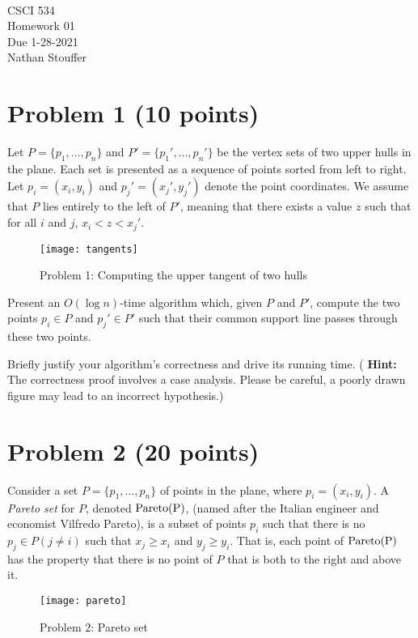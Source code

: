 \documentclass[11pt]{article}
\newcommand{\course}{CSCI 534}
\newcommand{\proj}{Homework 01}
\newcommand{\dueDate}{1-28-2021}
\newcommand{\name}{Nathan Stouffer}
\newcommand{\pareto}[1]{\rm{Pareto}(#1)}
\begin{document}
{ ~\\
    \course \\
    \proj \\
    Due \dueDate \\
    \name
}

\section*{Problem 1 (10 points)}

Let $P = \{ p_1, \ldots, p_n \}$ and $P' = \{ p_1', \ldots, p_n' \}$ be the
vertex sets of two upper hulls in the plane.  Each set is presented as a
sequence of points sorted from left to right.  Let $p_i = (x_i, y_i)$ and $p_j'
= (x_j', y_j')$ denote the point coordinates.  We assume that $P$ lies entirely
to the left of $P'$, meaning that there exists a value $z$ such that for all
$i$ and $j$, $x_i < z < x_j'$.

\begin{figure}[h]
    \centering
    \texttt{[image: tangents]}
    \caption{Problem 1: Computing the upper tangent of two hulls}
\end{figure}

Present an $O(\log n)$-time algorithm which, given $P$ and $P'$, compute the two
points $p_i \in P$ and $p_j' \in P'$ such that their common support line passes
through these two points.

Briefly justify your algorithm's correctness and drive its running time.  ({\bf
Hint:} The correctness proof involves a case analysis.  Please be careful, a
poorly drawn figure may lead to an incorrect hypothesis.)

\section*{Problem 2 (20 points)}

Consider a set $P = \{p_1, \ldots, p_n \}$ of points in the plane, where $p_i =
(x_i, y_i)$. A \emph{Pareto set} for $P$, denoted $\pareto{P}$, (named after
the Italian engineer and economist Vilfredo Pareto), is a subset of points
$p_i$ such that there is no $p_j \in P (j \neq i)$ such that $x_j \geq x_i$ and
$y_j \geq y_i$.  That is, each point of $\pareto{P}$ has the property that
there is no point of $P$ that is both to the right and above it.

\begin{figure}[h]
    \centering
    \texttt{[image: pareto]}
    \caption{Problem 2: Pareto set}
\end{figure}
\end{document}
